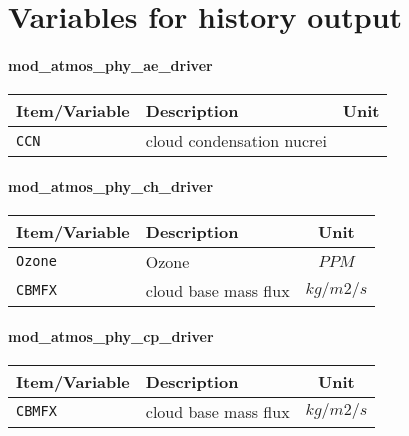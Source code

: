 \chapter{Variables for history output} \label{app:vari_hist}


\subsubsection{mod\_atmos\_phy\_ae\_driver}
 \begin{tabularx}{150mm}{|l|X|c|} \hline
 \rowcolor[gray]{0.9} Item/Variable & Description  & Unit \\ \hline
    \verb|CCN| & cloud condensation nucrei &   \\ \hline
 \end{tabularx}

\subsubsection{mod\_atmos\_phy\_ch\_driver}
 \begin{tabularx}{150mm}{|l|X|c|} \hline
 \rowcolor[gray]{0.9} Item/Variable & Description  & Unit \\ \hline
  \verb|Ozone| & Ozone & $PPM$  \\\hline
  \verb|CBMFX| & cloud base mass flux & $kg/m2/s$ \\\hline
 \end{tabularx}

\subsubsection{mod\_atmos\_phy\_cp\_driver}
 \begin{tabularx}{150mm}{|l|X|c|} \hline
 \rowcolor[gray]{0.9} Item/Variable & Description  & Unit \\ \hline
  \verb|CBMFX| & cloud base mass flux & $kg/m2/s$ \\\hline
 \end{tabularx}

